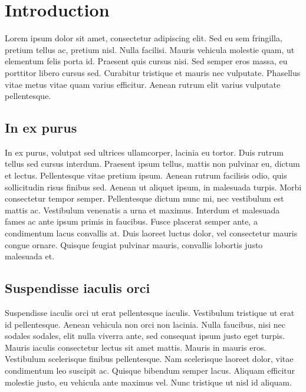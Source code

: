 
\chapter{Introduction}
Lorem ipsum dolor sit amet, consectetur adipiscing elit. Sed eu sem fringilla, pretium tellus ac, pretium nisl. Nulla facilisi. Mauris vehicula molestie quam, ut elementum felis porta id. Praesent quis cursus nisi. Sed semper eros massa, eu porttitor libero cursus sed. Curabitur tristique et mauris nec vulputate. Phasellus vitae metus vitae quam varius efficitur. Aenean rutrum elit varius vulputate pellentesque.

\section{In ex purus}
In ex purus, volutpat sed ultrices ullamcorper, lacinia eu tortor. Duis rutrum tellus sed cursus interdum. Praesent ipsum tellus, mattis non pulvinar eu, dictum et lectus. Pellentesque vitae pretium ipsum. Aenean rutrum facilisis odio, quis sollicitudin risus finibus sed. Aenean ut aliquet ipsum, in malesuada turpis. Morbi consectetur tempor semper. Pellentesque dictum nunc mi, nec vestibulum est mattis ac. Vestibulum venenatis a urna et maximus. Interdum et malesuada fames ac ante ipsum primis in faucibus. Fusce placerat semper ante, a condimentum lacus convallis at. Duis laoreet luctus dolor, vel consectetur mauris congue ornare. Quisque feugiat pulvinar mauris, convallis lobortis justo malesuada et.

\section{Suspendisse iaculis orci}
Suspendisse iaculis orci ut erat pellentesque iaculis. Vestibulum tristique ut erat id pellentesque. Aenean vehicula non orci non lacinia. Nulla faucibus, nisi nec sodales sodales, elit nulla viverra ante, sed consequat ipsum justo eget turpis. Mauris iaculis consectetur lectus sit amet mattis. Mauris in mauris eros. Vestibulum scelerisque finibus pellentesque. Nam scelerisque laoreet dolor, vitae condimentum leo suscipit ac. Quisque bibendum semper lacus. Aliquam efficitur molestie justo, eu vehicula ante maximus vel. Nunc tristique ut nisl id aliquam.

